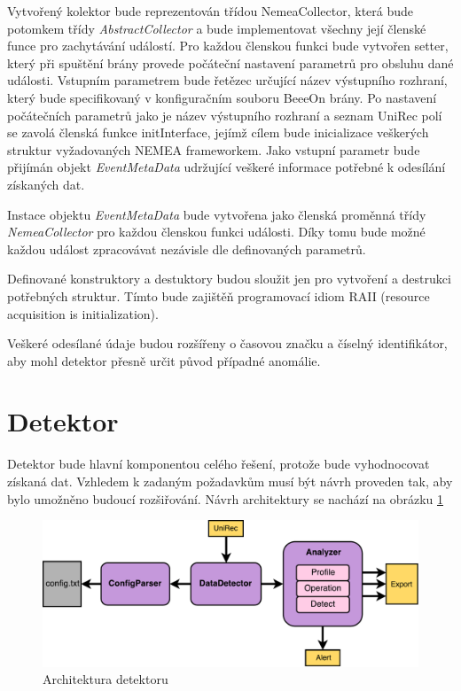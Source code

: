  Vytvořený kolektor bude reprezentován třídou NemeaCollector, která bude potomkem třídy
 \textit{AbstractCollector} a bude implementovat všechny její členské funce pro zachytávání událostí. Pro každou 
 členskou funkci  bude vytvořen setter, který při spuštění brány provede počáteční nastavení
 parametrů pro obsluhu dané 
 události. Vstupním parametrem bude řetězec určující název výstupního rozhraní, který bude
 specifikovaný v 
 konfiguračním souboru BeeeOn brány. Po nastavení počátečních parametrů jako je název výstupního
 rozhraní a seznam UniRec polí se zavolá členská funkce initInterface, jejímž cílem bude inicializace
 veškerých struktur vyžadovaných NEMEA frameworkem.
 Jako vstupní parametr bude přijímán objekt \textit{EventMetaData} udržující veškeré informace potřebné 
 k odesílání získaných dat.
 
 Instace objektu \textit{EventMetaData} bude vytvořena jako členská proměnná třídy \textit{NemeaCollector}
 pro každou členskou funkci události. Díky tomu bude možné každou událost zpracovávat nezávisle dle
 definovaných parametrů.
 
 Definované konstruktory a destuktory budou sloužit jen pro vytvoření a destrukci potřebných 
 struktur. Tímto bude zajištěň programovací idiom RAII (resource acquisition is initialization).
 
 Veškeré odesílané údaje budou rozšířeny o časovou značku a číselný identifikátor, aby mohl detektor
 přesně určit původ případné anomálie.
    
 \section{Detektor}
 Detektor bude hlavní komponentou celého řešení, protože bude vyhodnocovat získaná dat. Vzhledem
 k zadaným požadavkům musí být návrh proveden tak, aby bylo umožněno budoucí rozšiřování. Návrh 
 architektury se nachází na obrázku \ref{obr.detektor}
 \begin{figure}[ht]
   \begin{center}
   \includegraphics[scale=0.5]{pictures/detektor-arch}
   \caption{Architektura detektoru}
   \label{obr.detektor}
   \end{center}
   \end{figure}

